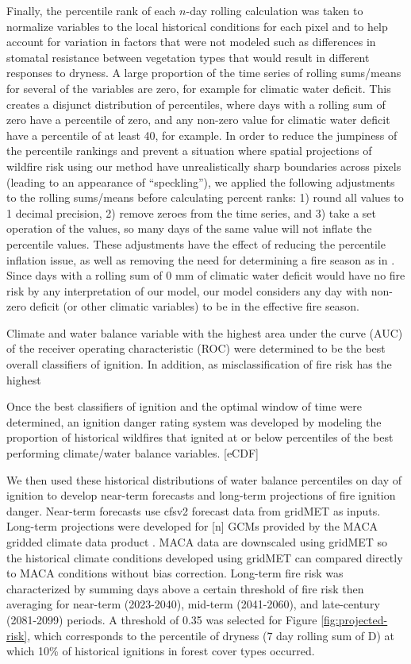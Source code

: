 \documentclass[11pt]{article}
\begin{document}
Finally, the percentile rank of each $n$-day rolling calculation was taken to normalize variables to the local historical conditions for each pixel and to help account for variation in factors that were not modeled such as differences in stomatal resistance between vegetation types that would result in different responses to dryness.  A large proportion of the time series of rolling sums/means for several of the variables are zero, for example for climatic water deficit.  This creates a disjunct distribution of percentiles, where days with a rolling sum of zero have a percentile of zero, and any non-zero value for climatic water deficit have a percentile of at least 40, for example.  In order to reduce the jumpiness of the percentile rankings and prevent a situation where spatial projections of wildfire risk using our method have unrealistically sharp boundaries across pixels (leading to an appearance of ``speckling''), we applied the following adjustments to the rolling sums/means before calculating percent ranks: 1) round all values to 1 decimal precision, 2) remove zeroes from the time series, and 3) take a set operation of the values, so many days of the same value will not inflate the percentile values. These adjustments have the effect of reducing the percentile inflation issue, as well as removing the need for determining a fire season as in \citet{thomaWaterBalanceIndicator2020}.  Since days with a rolling sum of 0 mm of climatic water deficit would have no fire risk by any interpretation of our model, our model considers any day with non-zero deficit (or other climatic variables) to be in the effective fire season.

Climate and water balance variable with the highest area under the curve (AUC) of the receiver operating characteristic (ROC) were determined to be the best overall classifiers of ignition.  In addition, as misclassification of fire risk has the highest 

Once the best classifiers of ignition and the optimal window of time were determined, an ignition danger rating system was developed by modeling the proportion of historical wildfires that ignited at or below percentiles of the best performing climate/water balance variables. [eCDF]

We then used these historical distributions of water balance percentiles on day of ignition to develop near-term forecasts and long-term projections of fire ignition danger.  Near-term forecasts use cfsv2 forecast data from gridMET as inputs.  Long-term projections were developed for [n] GCMs provided by the MACA gridded climate data product \citep{abatzoglouComparisonStatisticalDownscaling2012}.  MACA data are downscaled using gridMET so the historical climate conditions developed using gridMET can compared directly to MACA conditions without bias correction.  Long-term fire risk was characterized by summing days above a certain threshold of fire risk then averaging for near-term (2023-2040), mid-term (2041-2060), and late-century (2081-2099) periods.  A threshold of 0.35 was selected for Figure \ref{fig:projected-risk}, which corresponds to the percentile of dryness (7 day rolling sum of D) at which 10\% of historical ignitions in forest cover types occurred.
\end{document}

